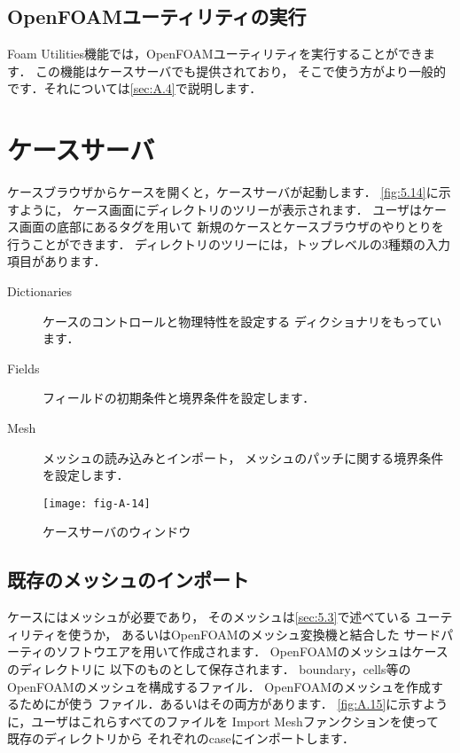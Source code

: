 \subsection{OpenFOAMユーティリティの実行}
\label{ssec:A.3.8}
Foam Utilities機能では，OpenFOAMユーティリティを実行することができます．
この機能はケースサーバでも提供されており，
そこで使う方がより一般的です．それについては\autoref{sec:A.4}で説明します．



\section{ケースサーバ}
\label{sec:A.4}
%
%
ケースブラウザからケースを開くと，ケースサーバが起動します．
\autoref{fig:5.14}に示すように，
ケース画面にディレクトリのツリーが表示されます．
ユーザはケース画面の底部にあるタグを用いて
新規のケースとケースブラウザのやりとりを行うことができます．
ディレクトリのツリーには，トップレベルの3種類の入力項目があります．
\begin{description}
 \item[Dictionaries] ケースのコントロールと物理特性を設定する
            ディクショナリをもっています．
 \item[Fields] フィールドの初期条件と境界条件を設定します．
 \item[Mesh] メッシュの読み込みとインポート，
            メッシュのパッチに関する境界条件を設定します．
\end{description}


\begin{figure}[ht]
 \texttt{[image: fig-A-14]}
 \caption{ケースサーバのウィンドウ}
 \label{fig:A.14}
\end{figure}


\subsection{既存のメッシュのインポート}
\label{ssec:A.4.1}
ケースにはメッシュが必要であり，
そのメッシュは\autoref{sec:5.3}で述べている
ユーティリティを使うか，
あるいはOpenFOAMのメッシュ変換機と結合した
サードパーティのソフトウエアを用いて作成されます．
OpenFOAMのメッシュはケースのディレクトリに
以下のものとして保存されます．
boundary，cells等のOpenFOAMのメッシュを構成するファイル．
OpenFOAMのメッシュを作成するためにが使う
ファイル．あるいはその両方があります．
\autoref{fig:A.15}に示すように，ユーザはこれらすべてのファイルを
Import Meshファンクションを使って
既存のディレクトリから
それぞれのcaseにインポートします．


